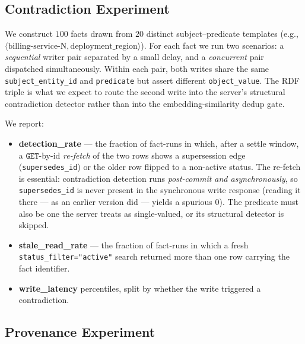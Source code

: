 \documentclass[10pt,twocolumn,letterpaper]{article}
\begin{document}
\subsection{Contradiction Experiment}

We construct \(100\) facts drawn from \(20\) distinct subject--predicate templates (e.g., \(\langle \text{billing-service-N}, \text{deployment\_region} \rangle\)). For each fact we run two scenarios: a \emph{sequential} writer pair separated by a small delay, and a \emph{concurrent} pair dispatched simultaneously. Within each pair, both writes share the same \texttt{subject\_entity\_id} and \texttt{predicate} but assert different \texttt{object\_value}. The RDF triple is what we expect to route the second write into the server's structural contradiction detector rather than into the embedding-similarity dedup gate.

We report:
\begin{itemize}
    \item \textbf{detection\_rate} --- the fraction of fact-runs in which, after a settle window, a \(\mathtt{GET}\)-by-id \emph{re-fetch} of the two rows shows a supersession edge (\texttt{supersedes\_id}) or the older row flipped to a non-active status. The re-fetch is essential: contradiction detection runs \emph{post-commit and asynchronously}, so \texttt{supersedes\_id} is never present in the synchronous write response (reading it there --- as an earlier version did --- yields a spurious \(0\)). The predicate must also be one the server treats as single-valued, or its structural detector is skipped.
    \item \textbf{stale\_read\_rate} --- the fraction of fact-runs in which a fresh \texttt{status\_filter="active"} search returned more than one row carrying the fact identifier.
    \item \textbf{write\_latency} percentiles, split by whether the write triggered a contradiction.
\end{itemize}

\subsection{Provenance Experiment}
\end{document}
